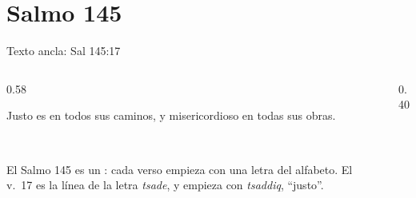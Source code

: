 \section{Salmo 145}

\begin{frame}{Texto ancla: Sal 145:17}
\begin{columns}[c,onlytextwidth]
\begin{column}{0.58\textwidth}
\begin{cita}Justo es \SENOR{} en todos sus caminos, y misericordioso en todas sus obras.\end{cita}
\begin{center}\\[2pt]\end{center}
\small El Salmo 145 es un : cada verso empieza con una letra del alfabeto. El v.~17 es la línea de la letra  \emph{tsade}, y empieza con \emph{tsaddiq}, ``justo''.
\end{column}
\begin{column}{0.40\textwidth}\end{column}
\end{columns}
\end{frame}


